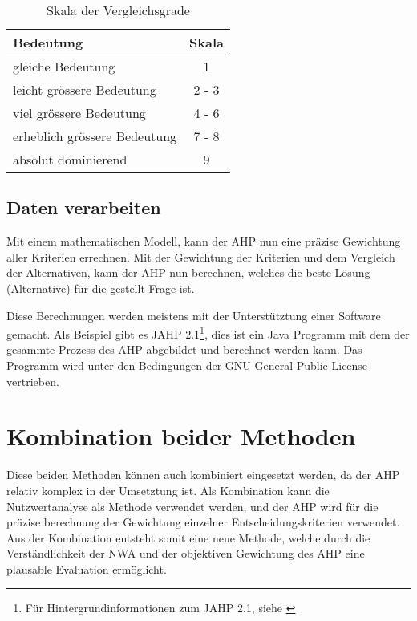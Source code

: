   \begin{table}[ht]
    \begin{center}
      \begin{tabular}{lc}
        \toprule
        Bedeutung & Skala\\
        \midrule
        gleiche Bedeutung & 1\\
        leicht grössere Bedeutung & 2 - 3\\
        viel grössere Bedeutung & 4 - 6\\
        erheblich grössere Bedeutung & 7 - 8\\
        absolut dominierend & 9\\
        \bottomrule
      \end{tabular}
      \caption{Skala der Vergleichsgrade}
      \label{tab:vergleichsgrade}
    \end{center}
  \end{table}
    
  \subsection{Daten verarbeiten}
  
  Mit einem mathematischen Modell, kann der \ac{AHP} nun eine präzise Gewichtung
  aller Kriterien errechnen. Mit der Gewichtung der Kriterien und dem Vergleich
  der Alternativen, kann der \ac{AHP} nun berechnen, welches die beste Lösung
  (Alternative) für die gestellt Frage ist.
  
  Diese Berechnungen werden meistens mit der Unterstütztung einer Software
  gemacht. Als Beispiel gibt es JAHP 2.1\footnote{Für Hintergrundinformationen
  zum JAHP 2.1, siehe \cite{JAHP}}, dies ist ein Java Programm mit dem der
  gesammte Prozess des \ac{AHP} abgebildet und berechnet werden kann. Das
  Programm wird unter den Bedingungen der GNU General Public License
  vertrieben.
    
  \section{Kombination beider Methoden}
  
  Diese beiden Methoden können auch kombiniert eingesetzt
  werden\cite{AhpNwaKombination}, da der \ac{AHP} relativ komplex in der
  Umsetztung ist. Als Kombination kann die Nutzwertanalyse als Methode
  verwendet werden, und der \ac{AHP} wird für die präzise berechnung der
  Gewichtung einzelner Entscheidungskriterien verwendet. Aus der Kombination
  entsteht somit eine neue Methode, welche durch die Verständlichkeit der
  \ac{NWA} und der objektiven Gewichtung des \ac{AHP} eine plausable Evaluation
  ermöglicht.